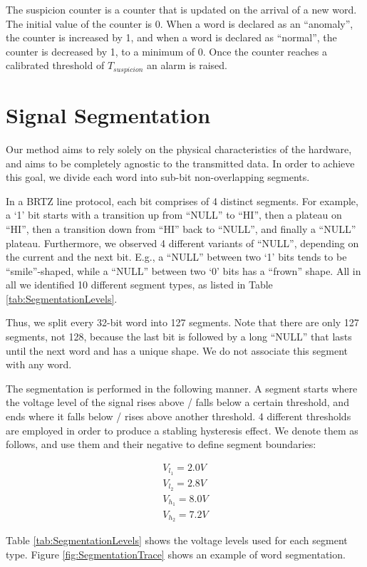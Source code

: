 \documentclass[compsoc,conference,a4paper,10pt,times]{IEEEtran}
\newcommand{\level}[1]{\section{#1}}
\newcommand{\level}[1]{\chapter{#1}}
\begin{document}
  The suspicion counter is a counter that is updated on the arrival of a new word. The initial value of the counter is 0. When a word is declared as an ``anomaly'', the counter is increased by 1, and when a word is declared as ``normal'', the counter is decreased by 1, to a minimum of 0. Once the counter reaches a calibrated threshold of $T_{suspicion}$ an alarm is raised.
  
\level{Signal Segmentation} \label{SignalSegmentation}
  Our method aims to rely solely on the physical characteristics of the hardware, and aims to be completely agnostic to the transmitted data. In order to achieve this goal, we divide each word into sub-bit non-overlapping segments.
  
  In a BRTZ line protocol, each bit comprises of 4 distinct segments. For example, a `1' bit starts with a transition up from ``NULL'' to ``HI'', then a plateau on ``HI'', then a transition down from ``HI'' back to ``NULL'', and finally a ``NULL'' plateau. Furthermore, we observed 4 different variants of ``NULL'', depending on the current and the next bit. E.g., a ``NULL'' between two `1' bits tends to be ``smile''-shaped, while a ``NULL'' between two `0' bits has a ``frown'' shape. All in all we identified 10 different segment types, as listed in Table \ref{tab:SegmentationLevels}.
  
  Thus, we split every 32-bit word into 127 segments. Note that there are only 127 segments, not 128, because the last bit is followed by a long ``NULL'' that lasts until the next word and has a unique shape. We do not associate this segment with any word.
  
  The segmentation is performed in the following manner. A segment starts where the voltage level of the signal rises above / falls below a certain threshold, and ends where it falls below / rises above another threshold. 4 different thresholds are employed in order to produce a stabling hysteresis effect. We denote them as follows, and use them and their negative to define segment boundaries:
  
  \begin{align*}
    V_{l_1} = 2.0V \\
    V_{l_2} = 2.8V \\
    V_{h_1} = 8.0V \\
    V_{h_2} = 7.2V 
  \end{align*}
  
  Table \ref{tab:SegmentationLevels} shows the voltage levels used for each segment type. Figure \ref{fig:SegmentationTrace} shows an example of word segmentation.
  
\end{document}
